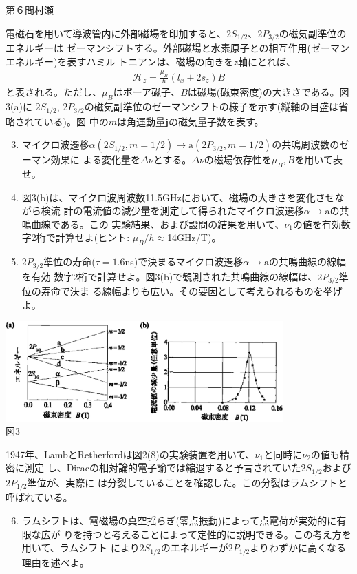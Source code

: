 \begin{question}{第６問}{村瀬}
\begin{center}
\end{center}
電磁石を用いて導波管内に外部磁場を印加すると、$2S_{1/2}$、$2P_{3/2}$の磁気副準位のエネルギーは
ゼーマンシフトする。外部磁場と水素原子との相互作用(ゼーマンエネルギー)を表すハミル
トニアンは、磁場の向きを$z$軸にとれば、
\begin{align*}
  \mathcal{H}_z = \frac{\mu_B}{\hbar}(l_x + 2s_z) B
\end{align*}
と表される。ただし、$\mu_B$はボーア磁子、$B$は磁場(磁束密度)の大きさである。図3(a)に
$2S_{1/2}$, $2P_{3/2}$の磁気副準位のゼーマンシフトの様子を示す(縦軸の目盛は省略されている)。図
中の$m$は角運動量$\bm j$の磁気量子数を表す。
\begin{enumerate}
\setcounter{enumi}{2}
\item{}
  マイクロ波遷移$\alpha(2S_{1/2},m=1/2)\to\mathrm{a}(2P_{3/2},m=1/2)$の共鳴周波数のゼーマン効果に
  よる変化量を$\Delta\nu$とする。$\Delta\nu$の磁場依存性を$\mu_B, B$を用いて表せ。
\item
  図3(b)は、マイクロ波周波数11.5GHzにおいて、磁場の大きさを変化させながら検流
  計の電流値の減少量を測定して得られたマイクロ波遷移$\alpha\to\mathrm{a}$の共鳴曲線である。この
  実験結果、および設問の結果を用いて、$\nu_1$の値を有効数字2桁で計算せよ(ヒント:
  $\mu_B/h\approx$14GHz/T)。
\item
  $2P_{3/2}$準位の寿命($\tau=1.6$ns)で決まるマイクロ波遷移$\alpha\to\mathrm{a}$の共鳴曲線の線幅を有効
  数字2桁で計算せよ。図3(b)で観測された共鳴曲線の線幅は、$2P_{3/2}$準位の寿命で決ま
  る線幅よりも広い。その要因として考えられるものを挙げよ。
\end{enumerate}
\begin{center}
  \includegraphics[width=0.8\textwidth]{2006physQ6_3r.eps}\\図3
\end{center}
1947年、LambとRetherfordは図2(8)の実験装置を用いて、$\nu_1$と同時に$\nu_2$の値も精密に測定
し、Diracの相対論的電子諭では縮退すると予言されていた$2S_{1/2}$および$2P_{1/2}$準位が、実際に
は分裂していることを確認した。この分裂はラムシフトと呼ばれている。
\begin{enumerate}
\setcounter{enumi}{5}
\item
  ラムシフトは、電磁場の真空揺らぎ(零点振動)によって点電荷が実効的に有限な広が
  りを持つと考えることによって定性的に説明できる。この考え方を用いて、ラムシフト
  により$2S_{1/2}$のエネルギーが$2P_{1/2}$よりわずかに高くなる理由を述べよ。
\end{enumerate}
\end{question}
